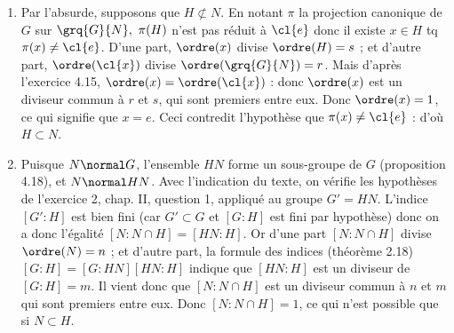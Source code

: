 
\begin{enumerate}
    \item Par l'absurde, supposons que $H \not\subset N$. En notant $\pi$ la projection canonique de $G$ sur $\grq{G}{N},~ \pi(H) $ n'est pas réduit à $\cl{e}$ donc 
    il existe $x\in H$ tq $\pi(x) \neq \cl{e}$. D'une part, $\ordre(x)$ divise $\ordre(H) = s$ ; et d'autre part, $\ordre(\cl{x})$ divise $\ordre(\grq{G}{N}) = r$. 
    Mais d'après l'exercice 4.15, $\ordre(x) = \ordre(\cl{x})$ : donc $\ordre(x)$ est un diviseur commun à $r$ et $s$, qui sont premiers entre eux. Donc $\ordre(x) = 1$, ce qui 
    signifie que $x=e$. Ceci contredit l'hypothèse que $\pi(x) \neq \cl{e}$ : d'où $H \subset N$. 

    \item Puisque $N \normal G$, l'ensemble $HN$ forme un sous-groupe de $G$ (proposition 4.18), et $N \normal HN$. Avec l'indication du texte, 
    on vérifie les hypothèses de l'exercice 2, chap. II, question 1, appliqué au groupe $G' = HN$. L'indice $[G':H]$ est bien fini (car $G'\subset G$ et $[G:H]$ est fini par hypothèse) donc 
    on a donc l'égalité $[N:N\cap H] = [HN:H]$. Or d'une part $[N:N\cap H]$ divise $\ordre(N) = n$ ; et d'autre part, la formule des indices (théorème 2.18) $[G:H] = [G:HN] [HN:H]$ indique que $[HN:H]$
    est un diviseur de $[G:H] = m$. Il vient donc que $[N:N\cap H]$ est un diviseur commun à $n$ et $m$ qui sont premiers entre eux. Donc $[N:N\cap H] = 1$, ce qui n'est possible que si $N\subset H$. 
\end{enumerate}

